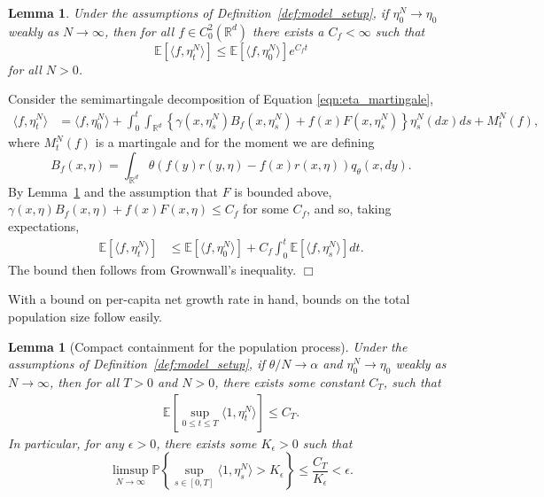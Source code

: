 \documentclass[12pt]{article}
\newenvironment {proof}{{\noindent\bf Proof }}{\hfill $\Box$ \medskip}
\newtheorem{lemma}[theorem]{Lemma}
\newcommand{\IP}{\mathbb P}
\newcommand{\IE}{\mathbb E}
\newcommand{\IR}{\mathbb R}
\begin{document}
\begin{lemma}
    \label{lem:eta_f_bound}
    Under the assumptions of Definition~\ref{def:model_setup},
    if $\eta^{N}_0 \to \eta_0$ weakly as $N \to \infty$,
    then for all $f \in C^2_0(\IR^d)$ there exists a $C_f < \infty$
    such that
    $$
        \IE[\langle f, \eta^N_t \rangle]
        \le
        \IE[\langle f, \eta^N_0 \rangle]
        e^{C_f t}
    $$
    for all $N > 0$.
\end{lemma}

\begin{proof}
    Consider the semimartingale decomposition of Equation \eqref{eqn:eta_martingale},
    \begin{align} \label{eqn:eta_f_mgale_decomp}
        \langle f, \eta^N_t \rangle
        &=
        \langle f, \eta^N_0 \rangle
        + \int_0^t \int_{\IR^d} \left\{
            \gamma(x, \eta^N_s) B_f(x, \eta^N_s)
            + f(x) F(x, \eta^N_s)
            \right\} \eta^N_s(dx) ds
        + M^N_t(f) ,
    \end{align}
    where $M^N_t(f)$ is a martingale and for the moment we are defining
    \begin{equation*}
        B_f(x, \eta) = \int_{\IR^d} \theta (f(y) r(y, \eta) - f(x) r(x, \eta)) q_\theta(x, dy) .
    \end{equation*}
    By Lemma~\ref{lem:eta_compact_containment} and the assumption that $F$ is bounded above,
    $\gamma(x, \eta) B_f(x, \eta) + f(x) F(x, \eta) \le C_f$ for some $C_f$,
    and so, taking expectations,
    \begin{align*}
        \IE\left[ \langle f, \eta^N_t \rangle \right]
        &\le
        \IE\left[ \langle f, \eta^N_0 \rangle \right]
        + C_f \int_0^t \IE\left[ \langle f, \eta^N_s \rangle \right] dt .
    \end{align*}
    The bound then follows from Grownwall's inequality.
\end{proof}

With a bound on per-capita net growth rate in hand,
bounds on the total population size follow easily.

\begin{lemma}[Compact containment for the population process]
    \label{lem:eta_compact_containment}
    Under the assumptions of Definition~\ref{def:model_setup},
    if $\theta/N \to \alpha$ and $\eta^{N}_0 \to \eta_0$ weakly as $N \to \infty$,
    then for all $T>0$ and $N > 0$, there exists some constant $C_T$,
    such that
    \begin{align}
        \label{eqn:eta_mass_bound}
        \IE\left[
            \sup_{0 \le t \le T}
            \langle 1, \eta^{N}_t \rangle
        \right]
        \le C_T .
    \end{align}
    In particular, for any $\epsilon > 0$, there exists some $K_{\epsilon}>0$ such that
    \begin{equation}
    \limsup_{N \to \infty}
        \IP \left\{ \sup_{s \in [0,T]}
            \langle 1 ,\eta^{N}_{s}\rangle
            > K_\epsilon \right\}
        \leq \frac{C_T}{K_{\epsilon}}
        < \epsilon .
    \end{equation}
\end{lemma}
\end{document}
